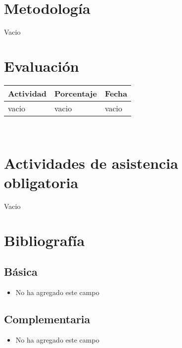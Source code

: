 \documentclass[11pt]{article}
\begin{document}
\section*{Metodología}

Vacio

\section*{Evaluación}
\noindent \begin{tabular}{R{0.5\textwidth} C{0.2\textwidth} C{0.2\textwidth}}
	\toprule
	\textbf{Actividad} & \textbf{Porcentaje} & \textbf{Fecha} \\
	\midrule
	vacio & vacio & vacio \\
	\midrule
\end{tabular}
\\
\section*{Actividades de asistencia obligatoria}

Vacio

\section*{Bibliografía}

\subsection*{Básica}

\begin{itemize}
\item No ha agregado este campo 
\end{itemize}

\subsection*{Complementaria}

\begin{itemize}
\item No ha agregado este campo 
\end{itemize}
\end{document}
